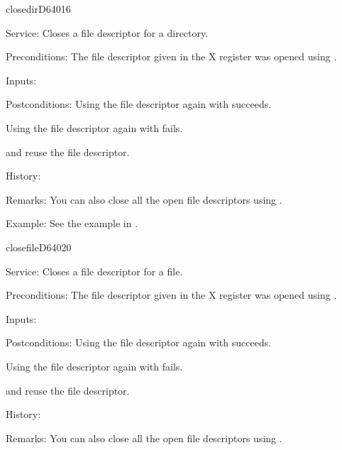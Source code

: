 \newpage
\begin{hyppotrap}{closedir}{D640}{16}
\item [Service:]
  Closes a file descriptor for a directory.
\item [Preconditions:]
  The file descriptor given in the X register was opened using
  .
\item [Inputs:]
\item [Postconditions:]
  Using the file descriptor again with  succeeds.

  Using the file descriptor again with  fails.

   and  reuse the file descriptor.
\item [History:]
\item [Remarks:]
  You can also close all the open file descriptors using .
\item [Example:]
  See the example in .
\end{hyppotrap}


\newpage
\begin{hyppotrap}{closefile}{D640}{20}
\item [Service:]
  Closes a file descriptor for a file.
\item [Preconditions:]
  The file descriptor given in the X register was opened using
  .
\item [Inputs:]
\item [Postconditions:]
  Using the file descriptor again with  succeeds.

  Using the file descriptor again with  fails.

   and  reuse the file descriptor.
\item [History:]
\item [Remarks:]
  You can also close all the open file descriptors using .
\end{hyppotrap}


